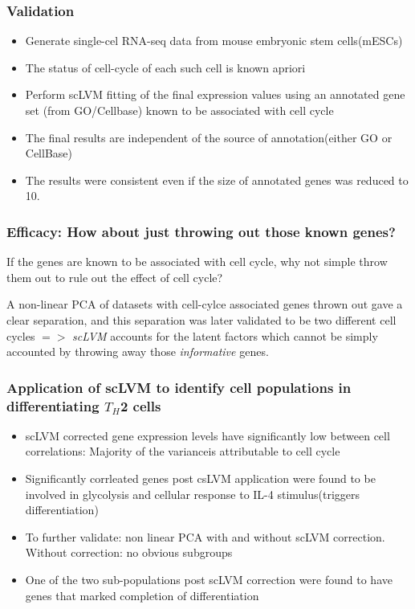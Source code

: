 \documentclass[10pt, compress]{beamer}
\renewcommand{\(}{\begin{columns}}
\renewcommand{\)}{\end{columns}}
\newcommand{\<}[1]{\begin{column}{#1}}
\renewcommand{\>}{\end{column}}
\begin{document}
\begin{frame}
\frametitle{Validation}
\begin{itemize}
\item Generate single-cel RNA-seq data from mouse embryonic stem cells(mESCs)
\item The status of cell-cycle of each such cell is known apriori
\item Perform scLVM fitting of the final expression values using an annotated gene set (from GO/Cellbase) known to be associated
with cell cycle
\item The final results are independent of the source of annotation(either GO or CellBase)
\item The results were consistent even if the size of annotated genes was reduced to 10.
\end{itemize}
\end{frame}

\begin{frame}
\frametitle{Efficacy: How about just throwing out those known genes?}
If the genes are known to be associated with cell cycle, why not simple throw them out to rule out the 
effect of cell cycle?

A non-linear PCA of datasets with cell-cylce associated genes thrown out gave a clear separation, and this separation
was later validated to be two different cell cycles $=>$ \textit{scLVM} accounts for the latent factors which
cannot be simply accounted by throwing away those \textit{informative} genes.

\end{frame}

\begin{frame}
\frametitle{Application of scLVM to identify cell populations in differentiating $T_H$2 cells}

\begin{itemize}
\item scLVM corrected gene expression levels have significantly low between cell correlations: Majority of the varianceis attributable to cell cycle
\item Significantly corrleated genes post csLVM application were found to be involved in glycolysis and cellular response to IL-4 stimulus(triggers differentiation)
\item To further validate: non linear PCA with and without scLVM correction. Without correction: no obvious subgroups
\item One of the two sub-populations post scLVM correction were found to have genes that marked completion of differentiation

\end{itemize}
\end{frame}
\end{document}
